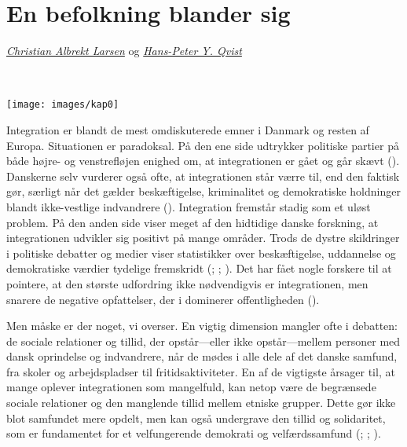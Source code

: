 \documentclass[
]{book}
\begin{document}
\newpage

\tableofcontents

\clearpage
\pagestyle{fancy}

\chapter{En befolkning blander sig}\label{kap1}


\thispagestyle{empty}

\emph{\href{https://vbn.aau.dk/en/persons/albrekt}{Christian Albrekt Larsen}} og \emph{\href{https://vbn.aau.dk/en/persons/hpq}{Hans-Peter Y. Qvist}}

~~~~

\texttt{[image: images/kap0]}

\newpage

Integration er blandt de mest omdiskuterede emner i Danmark og resten af Europa. Situationen er paradoksal. På den ene side udtrykker politiske partier på både højre- og venstrefløjen enighed om, at integrationen er gået og går skævt (). Danskerne selv vurderer også ofte, at integrationen står værre til, end den faktisk gør, særligt når det gælder beskæftigelse, kriminalitet og demokratiske holdninger blandt ikke-vestlige indvandrere (). Integration fremstår stadig som et uløst problem. På den anden side viser meget af den hidtidige danske forskning, at integrationen udvikler sig positivt på mange områder. Trods de dystre skildringer i politiske debatter og medier viser statistikker over beskæftigelse, uddannelse og demokratiske værdier tydelige fremskridt (; ; ). Det har fået nogle forskere til at pointere, at den største udfordring ikke nødvendigvis er integrationen, men snarere de negative opfattelser, der i dominerer offentligheden ().

Men måske er der noget, vi overser. En vigtig dimension mangler ofte i debatten: de sociale relationer og tillid, der opstår---eller ikke opstår---mellem personer med dansk oprindelse og indvandrere, når de mødes i alle dele af det danske samfund, fra skoler og arbejdspladser til fritidsaktiviteter. En af de vigtigste årsager til, at mange oplever integrationen som mangelfuld, kan netop være de begrænsede sociale relationer og den manglende tillid mellem etniske grupper. Dette gør ikke blot samfundet mere opdelt, men kan også undergrave den tillid og solidaritet, som er fundamentet for et velfungerende demokrati og velfærdssamfund (; ; ).
\end{document}
